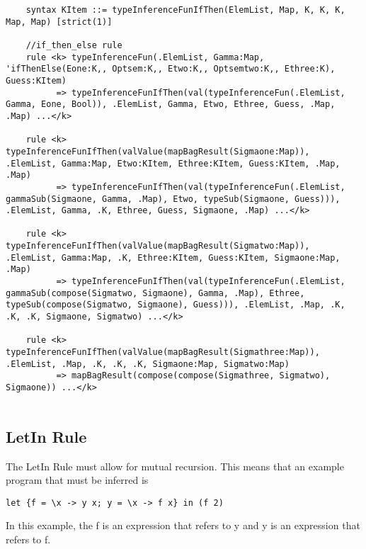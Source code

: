 \begin{lstlisting}
    syntax KItem ::= typeInferenceFunIfThen(ElemList, Map, K, K, K, Map, Map) [strict(1)]

    //if_then_else rule
    rule <k> typeInferenceFun(.ElemList, Gamma:Map, 'ifThenElse(Eone:K,, Optsem:K,, Etwo:K,, Optsemtwo:K,, Ethree:K), Guess:KItem)
          => typeInferenceFunIfThen(val(typeInferenceFun(.ElemList, Gamma, Eone, Bool)), .ElemList, Gamma, Etwo, Ethree, Guess, .Map, .Map) ...</k>

    rule <k> typeInferenceFunIfThen(valValue(mapBagResult(Sigmaone:Map)), .ElemList, Gamma:Map, Etwo:KItem, Ethree:KItem, Guess:KItem, .Map, .Map)
          => typeInferenceFunIfThen(val(typeInferenceFun(.ElemList, gammaSub(Sigmaone, Gamma, .Map), Etwo, typeSub(Sigmaone, Guess))), .ElemList, Gamma, .K, Ethree, Guess, Sigmaone, .Map) ...</k>

    rule <k> typeInferenceFunIfThen(valValue(mapBagResult(Sigmatwo:Map)), .ElemList, Gamma:Map, .K, Ethree:KItem, Guess:KItem, Sigmaone:Map, .Map)
          => typeInferenceFunIfThen(val(typeInferenceFun(.ElemList, gammaSub(compose(Sigmatwo, Sigmaone), Gamma, .Map), Ethree, typeSub(compose(Sigmatwo, Sigmaone), Guess))), .ElemList, .Map, .K, .K, .K, Sigmaone, Sigmatwo) ...</k>

    rule <k> typeInferenceFunIfThen(valValue(mapBagResult(Sigmathree:Map)), .ElemList, .Map, .K, .K, .K, Sigmaone:Map, Sigmatwo:Map)
          => mapBagResult(compose(compose(Sigmathree, Sigmatwo), Sigmaone)) ...</k>
          
\end{lstlisting}

\subsection{LetIn Rule}

The LetIn Rule must allow for mutual recursion. This means that an example program that must be inferred is

\begin{lstlisting}
let {f = \x -> y x; y = \x -> f x} in (f 2)
\end{lstlisting}

In this example, the f is an expression that refers to y and y is an expression that refers to f.

\begin{prooftree}
\end{prooftree}


